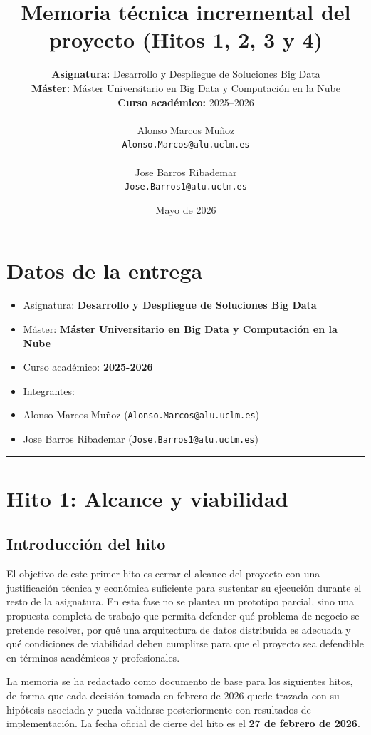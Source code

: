 \documentclass[12pt,a4paper]{article}
\title{\textbf{Memoria técnica incremental del proyecto (Hitos 1, 2, 3 y 4)}}
\author{
\textbf{Asignatura:} Desarrollo y Despliegue de Soluciones Big Data \\
\textbf{Máster:} Máster Universitario en Big Data y Computación en la Nube \\
\textbf{Curso académico:} 2025--2026 \\
\\
Alonso Marcos Muñoz \\
\nolinkurl{Alonso.Marcos@alu.uclm.es} \\
\\
Jose Barros Ribademar \\
\nolinkurl{Jose.Barros1@alu.uclm.es}
}
\date{Mayo de 2026}
\begin{document}
\maketitle
\tableofcontents
\newpage


\section*{Datos de la entrega}

\begin{itemize}
\item Asignatura: \textbf{Desarrollo y Despliegue de Soluciones Big Data}
\item Máster: \textbf{Máster Universitario en Big Data y Computación en la Nube}
\item Curso académico: \textbf{2025-2026}
\item Integrantes:
\item Alonso Marcos Muñoz (\nolinkurl{Alonso.Marcos@alu.uclm.es})
\item Jose Barros Ribademar (\nolinkurl{Jose.Barros1@alu.uclm.es})
\end{itemize}

\bigskip\hrule\bigskip

\section{Hito 1: Alcance y viabilidad}

\subsection{Introducción del hito}

El objetivo de este primer hito es cerrar el alcance del proyecto con una justificación técnica y económica suficiente para sustentar su ejecución durante el resto de la asignatura. En esta fase no se plantea un prototipo parcial, sino una propuesta completa de trabajo que permita defender qué problema de negocio se pretende resolver, por qué una arquitectura de datos distribuida es adecuada y qué condiciones de viabilidad deben cumplirse para que el proyecto sea defendible en términos académicos y profesionales.\par

La memoria se ha redactado como documento de base para los siguientes hitos, de forma que cada decisión tomada en febrero de 2026 quede trazada con su hipótesis asociada y pueda validarse posteriormente con resultados de implementación. La fecha oficial de cierre del hito es el \textbf{27 de febrero de 2026}.\par
\end{document}
